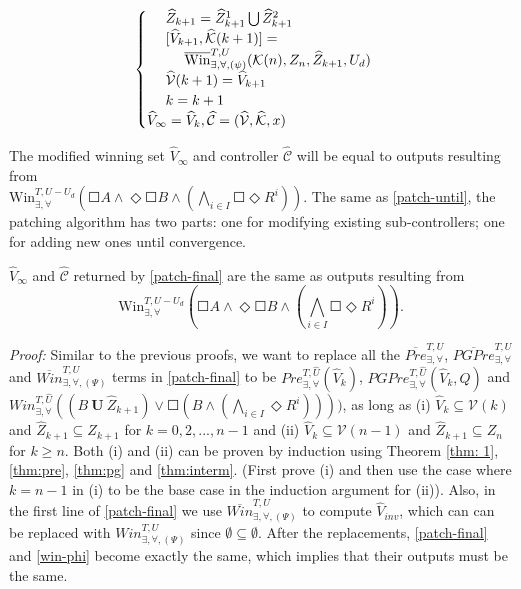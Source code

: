 {\begin{align}
\begin{cases}
\ \ \ \ \widehat{Z}_{k+1} = \widehat{Z}_{k+1}^1\bigcup\widehat{Z}_{k+1}^2  \\
\ \ \ \ [\widehat{V}_{k+1},\widehat{\mathcal{K}}(k+1)]=\\
\ \ \ \ \ \ \ \ \overline{\text{Win}}_{\exists,\forall,(\psi)}^{T, U}(\mathcal{K}(n),Z_{n},\widehat{Z}_{k+1},U_d)\\
\ \ \ \ \widehat{\mathcal{V}}(k+1)=\widehat{V}_{k+1}\\
\ \ \ \ {\color{black} k = k+1}\\
\widehat{V}_\infty = \widehat{V}_k, \widehat{\mathcal{C}} = (\widehat{\mathcal{V}},\widehat{\mathcal{K}},x) 
\end{cases}\label{patch-final}
\end{align}
}

The modified winning set $ \widehat{V}_{\infty} $ and controller $ \widehat{\mathcal{C}} $ will be equal to outputs resulting from \\
\noindent$ \text{Win}_{\exists, \forall}^{T,U-U_d}\left(\Square A \wedge \Diamond \Square B \wedge \left( \bigwedge_{i\in I} \Square \Diamond R^i\right)\right) $. 
The same as \eqref{patch-until}, the patching algorithm has two parts: one for modifying existing sub-controllers; one for adding new ones until convergence.

\begin{theorem}
	$ \widehat{V}_\infty $ and $ \widehat{\mathcal{C}} $ returned by \eqref{patch-final} are the same as outputs resulting from
\begin{displaymath}
	\text{Win}_{\exists, \forall}^{T,U-U_d}\left(\Square A \wedge \Diamond \Square B \wedge \left( \bigwedge_{i\in I} \Square \Diamond R^i\right)\right).
\end{displaymath} \label{thm:phi}
\end{theorem}
\emph{Proof:} Similar to the previous proofs, we want to replace all the $ \overline{Pre}^{T,U}_{\exists,\forall} $, $ \overline{PGPre}^{T,U}_{\exists,\forall} $ and $ \overline{Win}_{\exists,\forall, (\Psi)}^{T,U} $ terms in \eqref{patch-final} to be $ Pre^{T,\widehat{U}}_{\exists,\forall}(\widehat{V}_k) $, $PGPre^{T,\widehat{U}}_{\exists,\forall}(\widehat{V}_k, Q) $ and $ Win^{T,\widehat{U}}_{\exists,\forall}((B\ \mathbf{U}\ \widehat{Z}_{k+1})\vee\Square (B\wedge (\bigwedge_{i\in I}\Diamond R^i)))) $, as long as (i) $ \widehat{V}_{k} \subseteq \mathcal{V}(k) $ and $ \widehat{Z}_{k+1}\subseteq Z_{k+1} $ for $ k = 0, 2,...,n-1 $ and (ii) $ \widehat{V}_k\subseteq \mathcal{V}(n-1) $ and $ \widehat{Z}_{k+1}\subseteq Z_n $ for $ k\geq n $. Both (i) and (ii) can be proven by induction using Theorem \ref{thm: 1}, \ref{thm:pre}, \ref{thm:pg} and \ref{thm:interm}. (First prove (i) and then use the case where $ k=n-1 $ in (i) to be the base case in the induction argument for (ii)). Also, in the first line of \eqref{patch-final} we use $ \overline{Win}_{\exists,\forall,(\Psi)}^{T,U} $ to compute $ \widehat{V}_{inv} $, which can can be replaced with $ Win_{\exists,\forall,(\Psi)}^{T,U} $ since $ \emptyset\subseteq \emptyset $. After the replacements, \eqref{patch-final} and \eqref{win-phi} become exactly the same, which implies that their outputs must be the same. \QEDB


